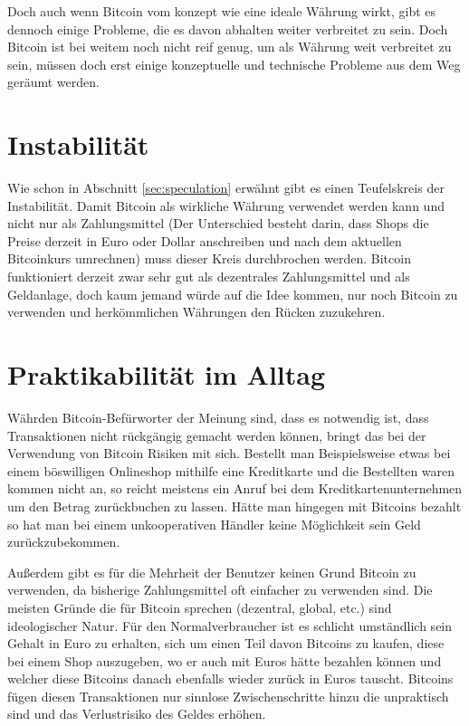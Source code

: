 Doch auch wenn Bitcoin vom konzept wie eine ideale Währung wirkt, gibt es dennoch einige Probleme, die es davon abhalten weiter verbreitet zu sein.
Doch Bitcoin ist bei weitem noch nicht reif genug, um als Währung weit verbreitet zu sein, müssen doch erst einige konzeptuelle und technische Probleme aus dem Weg geräumt werden.

\section{Instabilität}

Wie schon in Abschnitt \ref{sec:speculation} erwähnt gibt es einen Teufelskreis der Instabilität.
Damit Bitcoin als wirkliche Währung verwendet werden kann und nicht nur als Zahlungsmittel (Der Unterschied besteht darin, dass Shops die Preise derzeit in Euro oder Dollar anschreiben und nach dem aktuellen Bitcoinkurs umrechnen) muss dieser Kreis durchbrochen werden.
Bitcoin funktioniert derzeit zwar sehr gut als dezentrales Zahlungsmittel und als Geldanlage, doch kaum jemand würde auf die Idee kommen, nur noch Bitcoin zu verwenden und herkömmlichen Währungen den Rücken zuzukehren.

\section{Praktikabilität im Alltag}

Währden Bitcoin-Befürworter der Meinung sind, dass es notwendig ist, dass Transaktionen nicht rückgängig gemacht werden können, bringt das bei der Verwendung von Bitcoin Risiken mit sich.
Bestellt man Beispielsweise etwas bei einem böswilligen Onlineshop mithilfe eine Kreditkarte und die Bestellten waren kommen nicht an, so reicht meistens ein Anruf bei dem Kreditkartenunternehmen um den Betrag zurückbuchen zu lassen.
Hätte man hingegen mit Bitcoins bezahlt so hat man bei einem unkooperativen Händler keine Möglichkeit sein Geld zurückzubekommen.

Außerdem gibt es für die Mehrheit der Benutzer keinen Grund Bitcoin zu verwenden, da bisherige Zahlungsmittel oft einfacher zu verwenden sind.
Die meisten Gründe die für Bitcoin sprechen (dezentral, global, etc.) sind ideologischer Natur.
Für den Normalverbraucher ist es schlicht umständlich sein Gehalt in Euro zu erhalten, sich um einen Teil davon Bitcoins zu kaufen, diese bei einem Shop auszugeben, wo er auch mit Euros hätte bezahlen können und welcher diese Bitcoins danach ebenfalls wieder zurück in Euros tauscht.
Bitcoins fügen diesen Transaktionen nur sinnlose Zwischenschritte hinzu die unpraktisch sind und das Verlustrisiko des Geldes erhöhen.

